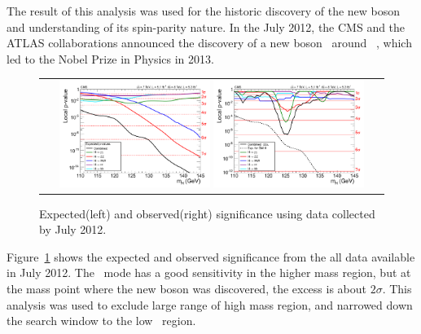 The result of this analysis was used for the historic discovery of the new boson 
and understanding of its spin-parity nature. In the July 2012, the CMS and 
the ATLAS collaborations announced the discovery of a new boson~\cite{Chatrchyan:2012ufa,Aad:2012tfa}
around ~\GeV, which led to the Nobel Prize in Physics in 2013. 
\begin{figure}[htp] 
\centering 
\begin{tabular}{c} 
\includegraphics[width=0.45\textwidth]{figures/fig1.pdf} 
\includegraphics[width=0.45\textwidth]{figures/fig15.pdf} 
\end{tabular} 
\caption{Expected(left) and observed(right) significance using data collected by July 2012.} 
\label{fig:ichep2012} 
\end{figure} 
Figure~\ref{fig:ichep2012} shows the expected and observed significance from 
the all data available in July 2012. The \hww\ mode has a good sensitivity 
in the higher mass region, but at the mass point where the new boson was 
discovered, the excess is about $2\sigma$. This analysis was used to 
exclude large range of high mass region, and narrowed down the search window
to the low \mHi\ region. 

